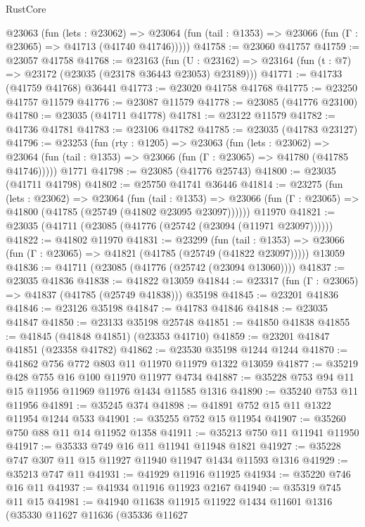 \begin{lexlean}{RustCore}
\begin{coremodule}
    @23063
      (fun (lets : @23062) =>
      @23064 (fun (tail : @1353) => @23066 (fun (Γ : @23065) => @41713 (@41740 @41746)))))
@41758 := @23060 @41757
@41759 := @23057 @41758
@41768 := @23163
    (fun (U : @23162) => @23164 (fun (t : @7) => @23172 (@23035 (@23178 @36443 @23053) @23189)))
@41771 := @41733 (@41759 @41768) @36441
@41773 := @23020 @41758 @41768
@41775 := @23250 @41757 @11579
@41776 := @23087 @11579
@41778 := @23085 (@41776 @23100)
@41780 := @23035 (@41711 @41778)
@41781 := @23122 @11579
@41782 := @41736 @41781
@41783 := @23106 @41782
@41785 := @23035 (@41783 @23127)
@41796 := @23253
    (fun (rty : @1205) =>
    @23063
      (fun (lets : @23062) =>
      @23064 (fun (tail : @1353) => @23066 (fun (Γ : @23065) => @41780 (@41785 @41746)))))
    @1771
@41798 := @23085 (@41776 @25743)
@41800 := @23035 (@41711 @41798)
@41802 := @25750 @41741 @36446
@41814 := @23275
    (fun (lets : @23062) =>
    @23064
      (fun (tail : @1353) =>
      @23066 (fun (Γ : @23065) => @41800 (@41785 (@25749 (@41802 @23095 @23097))))))
    @11970
@41821 := @23035 (@41711 (@23085 (@41776 (@25742 (@23094 (@11971 @23097))))))
@41822 := @41802 @11970
@41831 := @23299
    (fun (tail : @1353) => @23066 (fun (Γ : @23065) => @41821 (@41785 (@25749 (@41822 @23097)))))
    @13059
@41836 := @41711 (@23085 (@41776 (@25742 (@23094 @13060))))
@41837 := @23035 @41836
@41838 := @41822 @13059
@41844 := @23317 (fun (Γ : @23065) => @41837 (@41785 (@25749 @41838))) @35198
@41845 := @23201 @41836
@41846 := @23126 @35198
@41847 := @41783 @41846
@41848 := @23035 @41847
@41850 := @23133 @35198 @25748
@41851 := @41850 @41838
@41855 := @41845 (@41848 @41851) (@23353 @41710)
@41859 := @23201 @41847 @41851 (@23358 @41782)
@41862 := @23530 @35198 @1244 @1244
@41870 := @41862 @756 @772 @803 @11 @11970 @11979 @1322 @13059
@41877 := @35219 @428 @755 @16 @100 @11970 @11977 @4734
@41887 := @35228 @753 @94 @11 @15 @11956 @11969 @11976 @1434 @11585 @1316
@41890 := @35240 @753 @11 @11956
@41891 := @35245 @374
@41898 := @41891 @752 @15 @11 @1322 @11954 @1244 @533
@41901 := @35255 @752 @15 @11954
@41907 := @35260 @750 @88 @11 @14 @11952 @1358
@41911 := @35213 @750 @11 @11941 @11950
@41917 := @35333 @749 @16 @11 @11941 @11948 @1821
@41927 := @35228 @747 @307 @11 @15 @11927 @11940 @11947 @1434 @11593 @1316
@41929 := @35213 @747 @11
@41931 := @41929 @11916 @11925
@41934 := @35220 @746 @16 @11
@41937 := @41934 @11916 @11923 @2167
@41940 := @35319 @745 @11 @15
@41981 := @41940
    @11638
    @11915
    @11922
    @1434
    @11601
    @1316
    (@35330
      @11627
      @11636
      (@35336
        @11627

\end{coremodule}
\end{lexlean}

